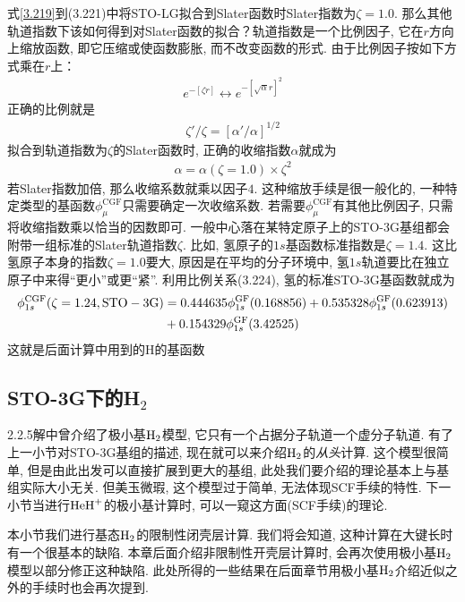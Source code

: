 式\eqref{3.219}到(3.221)中将STO-LG拟合到Slater函数时Slater指数为$\zeta=1.0$. 那么其他轨道指数下该如何得到对Slater函数的拟合？轨道指数是一个比例因子, 它在$r$方向上缩放函数, 即它压缩或使函数膨胀, 而不改变函数的形式. 由于比例因子按如下方式乘在$r$上：
\begin{align}
e^{-[\zeta r]} \leftrightarrow e^{-[\sqrt{\alpha}r]^2}
\end{align}
正确的比例就是
\begin{align}
\zeta'/\zeta=[\alpha'/\alpha]^{1/2}
\end{align}
拟合到轨道指数为$\zeta$的Slater函数时, 正确的收缩指数$\alpha$就成为
\begin{align}
\alpha = \alpha(\zeta=1.0)\times \zeta^2
\end{align}
若Slater指数加倍, 那么收缩系数就乘以因子$4$. 这种缩放手续是很一般化的, 一种特定类型的基函数$\phi_\mu^\mathrm{CGF}$只需要确定一次收缩系数. 若需要$\phi_\mu^\mathrm{CGF}$有其他比例因子, 只需将收缩指数乘以恰当的因数即可. 一般中心落在某特定原子上的STO-3G基组都会附带一组标准的Slater轨道指数$\zeta$. 比如, 氢原子的$1s$基函数标准指数是$\zeta=1.4$. 这比氢原子本身的指数$\zeta=1.0$要大, 原因是在平均的分子环境中, 氢$1s$轨道要比在独立原子中来得``更小”或更``紧”. 利用比例关系(3.224), 氢的标准STO-3G基函数就成为
\begin{align}
\label{3.225}
\phi_{1s}^\mathrm{CGF}(\zeta=1.24,\mathrm{STO-3G}) & = 0.444635\phi_{1s}^\mathrm{GF}(0.168856) + 0.535328\phi_{1s}^\mathrm{GF}(0.623913) \notag\\
& + 0.154329\phi_{1s}^\mathrm{GF}(3.42525)
\end{align}
这就是后面计算中用到的$\mathrm{H}$的基函数
\subsection{STO-3G下的H$_2$}
2.2.5解中曾介绍了极小基$\mathrm{H}_2$模型, 它只有一个占据分子轨道一个虚分子轨道. 有了上一小节对STO-3G基组的描述, 现在就可以来介绍$\mathrm{H}_2$的\emph{从头}\hft 计算. 这个模型很简单, 但是由此出发可以直接扩展到更大的基组, 此处我们要介绍的\hft 理论基本上与基组实际大小无关. 但美玉微瑕, 这个模型过于简单, 无法体现SCF手续的特性. 下一小节当进行$\mathrm{HeH}^+$的极小基计算时, 可以一窥这方面(SCF手续)的\hft 理论.

本小节我们进行基态$\mathrm{H}_2$的限制性闭壳层计算. 我们将会知道, 这种计算在大键长时有一个很基本的缺陷. 本章后面介绍非限制性开壳层计算时, 会再次使用极小基$\mathrm{H}_2$模型以部分修正这种缺陷. 此处所得的一些结果在后面章节用极小基$\mathrm{H}_2$介绍\hft 近似之外的手续时也会再次提到.


